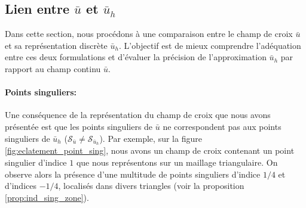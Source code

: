 \subsection{Lien entre $\bar{u}$ et $\bar{u}_h$}
\label{Lien_u_u_h}

Dans cette section, nous procédons à une comparaison entre le champ de croix $\bar{u}$ et sa représentation discrète $\bar{u}_h$. L'objectif est de mieux comprendre l'adéquation entre ces deux formulations et d'évaluer la précision de l'approximation $\bar{u}_h$ par rapport au champ continu $\bar{u}$.

\paragraph{Points singuliers:}
Une conséquence de la représentation du champ de croix que nous avons présentée est que les points singuliers de $\bar{u}$ ne correspondent pas aux points singuliers de $\bar{u}_h$ ($\mathcal{S}_{\bar{u}}\neq\mathcal{S}_{\bar{u}_h}$). Par exemple, sur la figure \ref{fig:eclatement_point_sing}, nous avons un champ de croix contenant un point singulier d'indice $1$ que nous représentons sur un maillage triangulaire. On observe alors la présence d'une multitude de points singuliers d'indice $1/4$ et d'indices $-1/4$, localisés dans divers triangles (voir la proposition \ref{prop:ind_sing_zone}).

